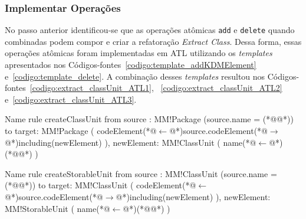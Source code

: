 
\subsubsection{Implementar Operações}

No passo anterior identificou-se que as operações atômicas \texttt{add} e \texttt{delete} quando combinadas podem compor e criar a refatoração \textit{Extract Class}. Dessa forma, essas operações atômicas foram implementadas em ATL utilizando os \textit{templates} apresentados nos Códigos-fontes~\ref{codigo:template_addKDMElement} e~\ref{codigo:template_delete}. A combinação desses \textit{templates} resultou nos Códigos-fontes~\ref{codigo:extract_classUnit_ATL1}, ~\ref{codigo:extract_classUnit_ATL2} e~\ref{codigo:extract_classUnit_ATL3}. 

\begin{codigo}[caption={[ATL representando a operação atômica \texttt{add} \texttt{ClassUnit} da refatoração \textit{Extract ClassUnit}.] ATL representando a operação atômica \texttt{add} \texttt{ClassUnit} da refatoração \textit{Extract ClassUnit}.},escapeinside={(*@}{@*)}, basicstyle=\footnotesize, label={codigo:extract_classUnit_ATL1}, language=ATL]{Name}
rule createClassUnit {
	from
		source : MM!Package (source.name = (*@@*))
	to 
		target: MM!Package (
			codeElement(*@$\leftarrow$@*)source.codeElement(*@$\rightarrow$@*)including(newElement)
		),
		newElement: MM!ClassUnit (
			name(*@$\leftarrow$@*)(*@@*)
		)
}
\end{codigo}

\begin{codigo}[caption={[ATL representando a operação atômica \texttt{add} \texttt{StorableUnit} da refatoração \textit{Extract ClassUnit}.] ATL representando a operação atômica \texttt{add} \texttt{StorableUnit} da refatoração \textit{Extract ClassUnit}.},escapeinside={(*@}{@*)}, basicstyle=\footnotesize, label={codigo:extract_classUnit_ATL2}, language=ATL]{Name}
rule createStorableUnit {
	from
		source : MM!ClassUnit (source.name = (*@@*))
	to 
		target: MM!ClassUnit (
			codeElement(*@$\leftarrow$@*)source.codeElement(*@$\rightarrow$@*)including(newElement)
		),
		newElement: MM!StorableUnit (
			name(*@$\leftarrow$@*)(*@@*)
		)
}
\end{codigo}

